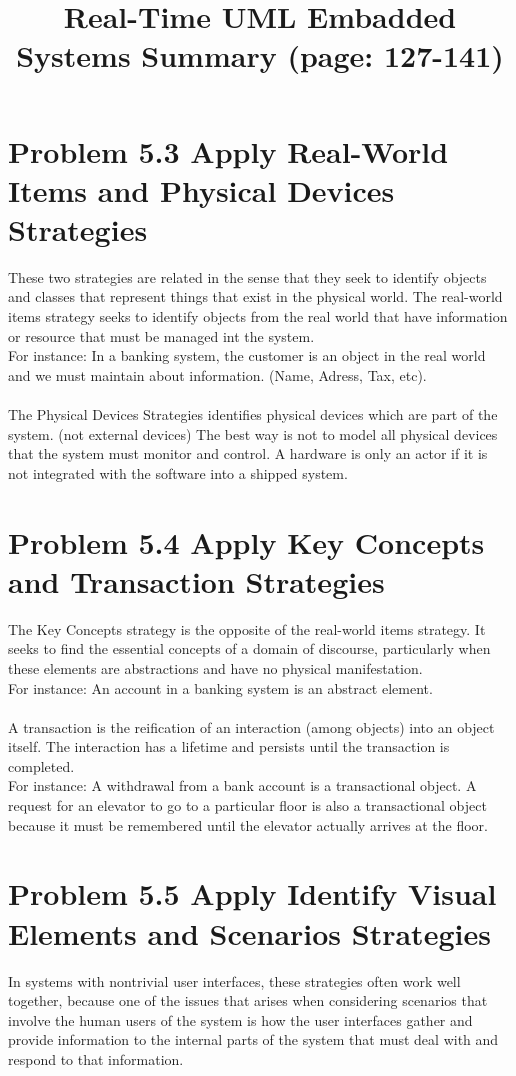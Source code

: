 \documentclass[12pt,a4paper]{article}
\title{Real-Time UML Embadded Systems Summary (page: 127-141)}
\begin{document}
\maketitle

\section{Problem 5.3 Apply Real-World Items and Physical Devices Strategies}
These two strategies are related in the sense that they seek to identify objects and
classes that represent things that exist in the physical world. The real-world items strategy seeks to identify objects from the real world that have information or resource that must be managed int the system. \\
 For instance: In a banking system, the customer is an object in the real world and we must maintain about information. (Name, Adress, Tax, etc).
 \\ \\
The Physical Devices Strategies identifies physical devices which are part of the system. (not external devices) The best way is not to model all physical devices that the system must monitor and control. A hardware is only
an actor if it is not integrated with the software into a shipped system.

\section{Problem 5.4 Apply Key Concepts and Transaction Strategies}
The Key Concepts strategy is the opposite of the real-world items strategy. It seeks
to find the essential concepts of a domain of discourse, particularly when these elements are abstractions and have no physical manifestation. \\ 
For instance: An account in a banking system is an abstract element.
 \\ \\
 
A transaction is the reification of an interaction (among objects) into an object itself. The interaction has a lifetime and persists until the transaction is completed. \\
For instance:  A withdrawal from a bank account is a transactional object. A request for an elevator to go to a particular floor is also a transactional object because it must be remembered until the elevator actually arrives at the floor.

\section{Problem 5.5 Apply Identify Visual Elements and Scenarios Strategies}
In systems with nontrivial user interfaces, these strategies often
work well together, because one of the issues that arises when considering scenarios that involve the human users of the system is how the user interfaces gather and provide information to the internal parts of the system that must deal with and respond to that information. \\
\end{document}
